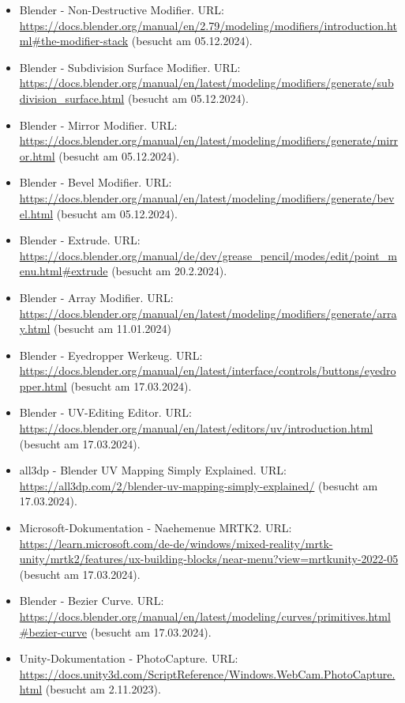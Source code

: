 \begin{itemize}[leftmargin=0pt]
    \item Blender - Non-Destructive Modifier. {\scriptsize URL:} \url{https://docs.blender.org/manual/en/2.79/modeling/modifiers/introduction.html#the-modifier-stack} (besucht am 05.12.2024).
    \item Blender - Subdivision Surface Modifier. {\scriptsize URL:} \url{https://docs.blender.org/manual/en/latest/modeling/modifiers/generate/subdivision_surface.html} (besucht am 05.12.2024).
    \item Blender - Mirror Modifier. {\scriptsize URL:} \url{https://docs.blender.org/manual/en/latest/modeling/modifiers/generate/mirror.html} (besucht am 05.12.2024).
    \item Blender - Bevel Modifier. {\scriptsize URL:} \url{https://docs.blender.org/manual/en/latest/modeling/modifiers/generate/bevel.html} (besucht am 05.12.2024).
    \item Blender - Extrude. {\scriptsize URL:} \url{https://docs.blender.org/manual/de/dev/grease_pencil/modes/edit/point_menu.html#extrude} (besucht am 20.2.2024).
    \item Blender - Array Modifier. {\scriptsize URL:} \url{https://docs.blender.org/manual/en/latest/modeling/modifiers/generate/array.html} (besucht am 11.01.2024)
    \item Blender - Eyedropper Werkeug. {\scriptsize URL:} \url{https://docs.blender.org/manual/en/latest/interface/controls/buttons/eyedropper.html} (besucht am 17.03.2024).
    \item Blender - UV-Editing Editor. {\scriptsize URL:} \url{https://docs.blender.org/manual/en/latest/editors/uv/introduction.html} (besucht am 17.03.2024).
    \item all3dp - Blender UV Mapping Simply Explained. {\scriptsize URL:} \url{https://all3dp.com/2/blender-uv-mapping-simply-explained/} (besucht am 17.03.2024).
    \item Microsoft-Dokumentation - Naehemenue MRTK2. {\scriptsize URL:} \url{https://learn.microsoft.com/de-de/windows/mixed-reality/mrtk-unity/mrtk2/features/ux-building-blocks/near-menu?view=mrtkunity-2022-05} (besucht am 17.03.2024).
    \item Blender - Bezier Curve. {\scriptsize URL:} \url{https://docs.blender.org/manual/en/latest/modeling/curves/primitives.html#bezier-curve} (besucht am 17.03.2024).
    \item Unity-Dokumentation - PhotoCapture. {\scriptsize URL:}  \url{https://docs.unity3d.com/ScriptReference/Windows.WebCam.PhotoCapture.html} (besucht am 2.11.2023).

\end{itemize}
